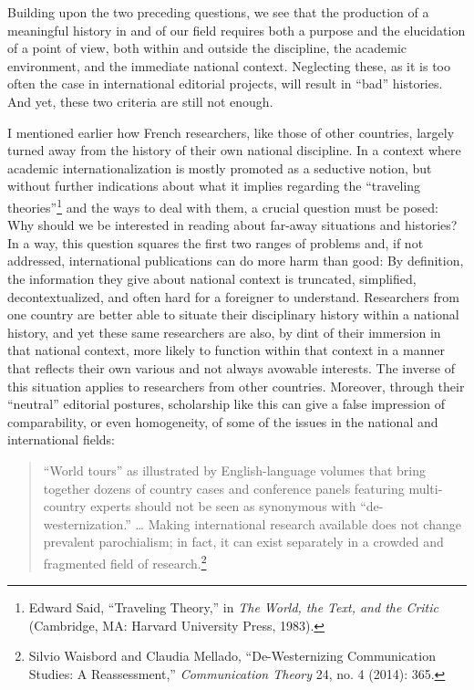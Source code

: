 \documentclass{tufte-handout}
\begin{document}
Building upon the two preceding questions, we see that the production of
a meaningful history in and of our field requires both a purpose and the
elucidation of a point of view, both within and outside the discipline,
the academic environment, and the immediate national context. Neglecting
these, as it is too often the case in international editorial projects,
will result in ``bad'' histories. And yet, these two criteria are still
not enough.

I mentioned earlier how French researchers, like those of other
countries, largely turned away from the history of their own national
discipline. In a context where academic internationalization is mostly
promoted as a seductive notion, but without further indications about
what it implies regarding the ``traveling
theories''\footnote{Edward Said, ``Traveling Theory,'' in \emph{The World, the Text, and
  the Critic} (Cambridge, MA: Harvard University Press, 1983).
} and the ways to deal
with them, a crucial question must be posed: Why should we be interested
in reading about far-away situations and histories? In a way, this
question squares the first two ranges of problems and, if not addressed,
international publications can do more harm than good: By definition,
the information they give about national context is truncated,
simplified, decontextualized, and often hard for a foreigner to
understand. Researchers from one country are better able to situate
their disciplinary history within a national history, and yet these same
researchers are also, by dint of their immersion in that national
context, more likely to function within that context in a manner that
reflects their own various and not always avowable interests. The
inverse of this situation applies to researchers from other countries.
Moreover, through their ``neutral'' editorial postures, scholarship like
this can give a false impression of comparability, or even homogeneity,
of some of the issues in the national and international fields:

\begin{quote}
``World tours'' as illustrated by English-language volumes that bring
together dozens of country cases and conference panels featuring
multi-country experts should not be seen as synonymous with
``de-westernization.'' \ldots{} Making international research available
does not change prevalent parochialism; in fact, it can exist separately
in a crowded and fragmented field of
research.\footnote{Silvio Waisbord and Claudia Mellado, ``De-Westernizing Communication
  Studies: A Reassessment,'' \emph{Communication Theory} 24, no. 4
  (2014): 365.
}
\end{quote}
\end{document}
